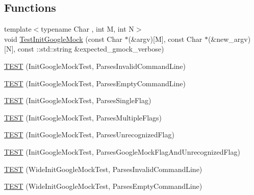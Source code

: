 \subsection*{Functions}
\begin{DoxyCompactItemize}
\item 
{\footnotesize template$<$typename Char , int M, int N$>$ }\\void \mbox{\hyperlink{_obj__test_2lib_2googletest-release-1_88_81_2googlemock_2test_2gmock__test_8cc_ac9c8ae8722c330d47f75dee43fb8ab78}{Test\+Init\+Google\+Mock}} (const Char $\ast$(\&argv)\mbox{[}M\mbox{]}, const Char $\ast$(\&new\+\_\+argv)\mbox{[}N\mbox{]}, const \+::std\+::string \&expected\+\_\+gmock\+\_\+verbose)
\item 
\mbox{\hyperlink{_obj__test_2lib_2googletest-release-1_88_81_2googlemock_2test_2gmock__test_8cc_a7c86c6c98b72e903135c1b01370a13f3}{T\+E\+ST}} (Init\+Google\+Mock\+Test, Parses\+Invalid\+Command\+Line)
\item 
\mbox{\hyperlink{_obj__test_2lib_2googletest-release-1_88_81_2googlemock_2test_2gmock__test_8cc_a29b51be89eb52fa64713438ecf4ab924}{T\+E\+ST}} (Init\+Google\+Mock\+Test, Parses\+Empty\+Command\+Line)
\item 
\mbox{\hyperlink{_obj__test_2lib_2googletest-release-1_88_81_2googlemock_2test_2gmock__test_8cc_ae24e1f90eac538406a16306612d7c380}{T\+E\+ST}} (Init\+Google\+Mock\+Test, Parses\+Single\+Flag)
\item 
\mbox{\hyperlink{_obj__test_2lib_2googletest-release-1_88_81_2googlemock_2test_2gmock__test_8cc_af2ebcdde7f19ba9d002c20673e41fb97}{T\+E\+ST}} (Init\+Google\+Mock\+Test, Parses\+Multiple\+Flags)
\item 
\mbox{\hyperlink{_obj__test_2lib_2googletest-release-1_88_81_2googlemock_2test_2gmock__test_8cc_ada1ddcc67dc056492a76fa398429038f}{T\+E\+ST}} (Init\+Google\+Mock\+Test, Parses\+Unrecognized\+Flag)
\item 
\mbox{\hyperlink{_obj__test_2lib_2googletest-release-1_88_81_2googlemock_2test_2gmock__test_8cc_aea344ddf9b83f7912dde4f8e7adbd4e2}{T\+E\+ST}} (Init\+Google\+Mock\+Test, Parses\+Google\+Mock\+Flag\+And\+Unrecognized\+Flag)
\item 
\mbox{\hyperlink{_obj__test_2lib_2googletest-release-1_88_81_2googlemock_2test_2gmock__test_8cc_ad66fde04be818693ebdcdcfc9943d57f}{T\+E\+ST}} (Wide\+Init\+Google\+Mock\+Test, Parses\+Invalid\+Command\+Line)
\item 
\mbox{\hyperlink{_obj__test_2lib_2googletest-release-1_88_81_2googlemock_2test_2gmock__test_8cc_ad08ca27203202ca15cdf8eaaa7003ba7}{T\+E\+ST}} (Wide\+Init\+Google\+Mock\+Test, Parses\+Empty\+Command\+Line)

\end{DoxyCompactItemize}
